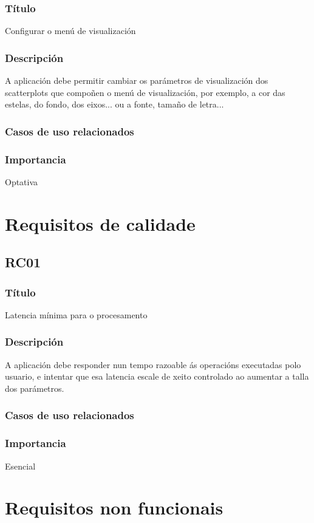\subsubsection{Título}
Configurar o menú de visualización
\subsubsection{Descripción}
A aplicación debe permitir cambiar os parámetros de visualización dos scatterplots que compoñen o menú de visualización, por exemplo, a cor das estelas, do fondo, dos eixos... ou a fonte, tamaño de letra...
\subsubsection{Casos de uso relacionados}
\subsubsection{Importancia}
Optativa

\section{Requisitos de calidade}

\subsection*{RC01}
\subsubsection{Título}
Latencia mínima para o procesamento
\subsubsection{Descripción}
A aplicación debe responder nun tempo razoable ás operacións executadas polo usuario, e intentar que esa latencia escale de xeito controlado ao aumentar a talla dos parámetros.
\subsubsection{Casos de uso relacionados}
\subsubsection{Importancia}
Esencial

\section{Requisitos non funcionais}

